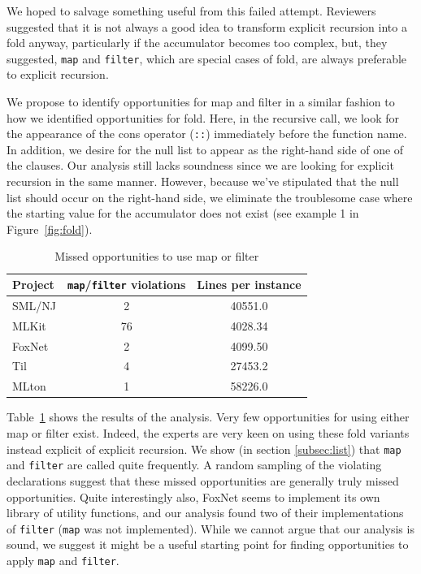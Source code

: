 \documentclass[12pt,abstracton]{scrartcl}
\begin{document}
We hoped to salvage something useful from this failed attempt.
Reviewers suggested that it is not always a good idea to transform
explicit recursion into a fold anyway, particularly if the accumulator becomes
too complex, but, they suggested, \texttt{map} and \texttt{filter}, which are
special cases of fold, are always preferable to explicit recursion.

We propose to identify opportunities for map and filter
in a similar fashion to how we identified opportunities for fold.
Here, in the recursive call, we look for the appearance of the cons operator (\texttt{::})
immediately before the function name. In addition, we desire for the
null list to appear as the right-hand side of one of the clauses.
Our analysis still lacks soundness since we are looking for
explicit recursion in the same manner. However, because we've stipulated
that the null list should occur on the right-hand side, we eliminate
the troublesome case where the starting value for the accumulator does not exist
(see example 1 in Figure~\ref{fig:fold}).

\begin{table}[h!]
\centering
\begin{tabular}{|l||c|c|}\hline
Project & \texttt{map}/\texttt{filter} violations & Lines per instance \\ \hline\hline
SML/NJ & 2 & 40551.0 \\
MLKit & 76 & 4028.34 \\
FoxNet & 2 & 4099.50 \\
Til & 4 & 27453.2 \\
MLton & 1 & 58226.0 \\ \hline
\end{tabular}
\caption{Missed opportunities to use map or filter}
\label{table:mapfilter}
\end{table}

Table~\ref{table:mapfilter} shows the results of the analysis.
Very few opportunities for using either map or filter exist.
Indeed, the experts are very keen on using these fold variants
instead explicit of explicit recursion.
We show (in section \ref{subsec:list})
that \texttt{map} and \texttt{filter} are called quite frequently.
A random sampling of the violating declarations suggest that
these missed opportunities are generally truly missed opportunities.
Quite interestingly also, FoxNet seems to implement its own library
of utility functions, and our analysis found two of their
implementations of \texttt{filter} (\texttt{map} was not implemented).
While we cannot argue that our analysis is sound, we suggest it might
be a useful starting point for finding opportunities to apply
\texttt{map} and \texttt{filter}.
\end{document}
